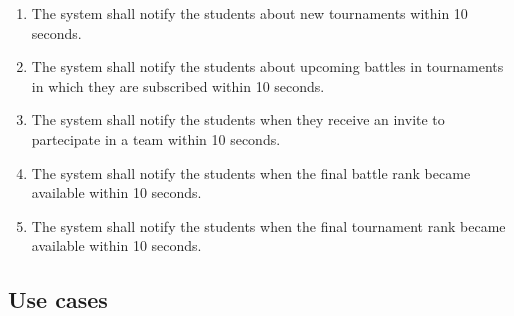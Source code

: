 \begin{enumerate}[series=requirements, label=\textbf{R.\arabic*}]
            \item {} {The system shall notify the students about new tournaments within 10 seconds.}
            \item {} {The system shall notify the students about upcoming battles in tournaments in which they are subscribed within 10 seconds.}
             \item {} {The system shall notify the students when they receive an invite to partecipate in a team within 10 seconds.}
             \item {} {The system shall notify the students when the final battle rank became available within 10 seconds.}
             \item {} {The system shall notify the students when the final tournament rank became available within 10 seconds.}
        \end{enumerate}

    \subsection{Use cases}


